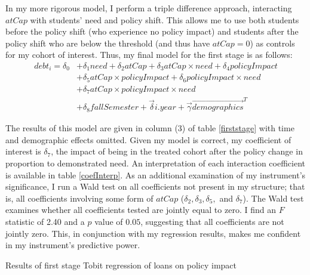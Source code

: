 \documentclass[12pt]{article}
\newcommand{\regs}{../Analysis/Regressions/Output/}
\begin{document}
	In my more rigorous model, I perform a triple difference approach, interacting $atCap$ with students' need and policy shift. This allows me to use both students before the policy shift (who experience no policy impact) and students after the policy shift who are below the threshold (and thus have $atCap = 0$) as controls for my cohort of interest. Thus, my final model for the first stage is as follows: 
	\begin{equation}
	\begin{aligned}
	debt_i = \delta_0 &+ \delta_1 need + \delta_2 atCap + \delta_3 atCap \times need + \delta_4 policyImpact \\
	&+ \delta_5 atCap \times policyImpact + \delta_6 policyImpact \times need \\
	&+ \delta_7 atCap \times policyImpact \times need \\
	&+ \delta_8 fallSemester + \vec{\delta} i.year + \vec{\gamma} \vec{demographics}^T
	 \end{aligned}
	 \end{equation} 
	 
	 The results of this model are given in column (3) of table \ref{firststage} with time and demographic effects omitted. Given my model is correct, my coefficient of interest is $\delta_7$, the impact of being in the treated cohort after the policy change in proportion to demonstrated need. An interpretation of each interaction coefficient is available in table \ref{coefInterp}. As an additional examination of my instrument's significance, I run a Wald test on all coefficients not present in my structure; that is, all coefficients involving some form of $atCap$ ($\delta_2, \delta_3, \delta_5,$ and $\delta_7$). The Wald test examines whether all coefficients tested are jointly equal to zero. I find an $F$ statistic of 2.40 and a $p$ value of $0.05$, suggesting that all coefficients are not jointly zero. This, in conjunction with my regression results, makes me confident in my instrument's predictive power.
	 
	 \begin{table}
	 	\centering
	 	\caption{Results of first stage Tobit regression of loans on policy impact}	 
	 	\resizebox{\textwidth}{!}{	
		 	
		 }
	 	\label{firststage}
	 \end{table}
	
\end{document}
